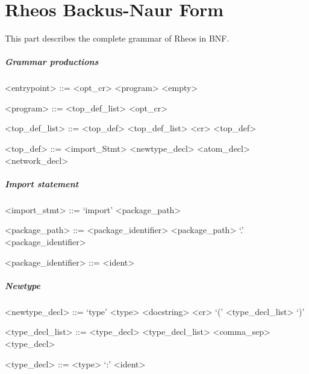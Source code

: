 \chapter{Rheos Backus-Naur Form}\label{ch:bnf}
This part describes the complete grammar of Rheos in BNF.


\paragraph{Grammar productions}

\begin{grammar}
  <entrypoint> ::= <opt_cr> <program>
  \alt <empty>

  <program> ::= <top_def_list> <opt_cr>

  <top_def_list> ::= <top_def>
  \alt <top_def_list> <cr> <top_def>

  <top_def> ::= <import_Stmt>
  \alt <newtype_decl>
  \alt <atom_decl>
  \alt <network_decl>
\end{grammar}


\paragraph{Import statement}

\begin{grammar}
  <import_stmt> ::= `import' <package_path>

  <package_path> ::= <package_identifier>
  \alt <package_path> `.' <package_identifier>

  <package_identifier> ::= <ident>
\end{grammar}


\paragraph{Newtype}

\begin{grammar}
  <newtype_decl> ::= `type' <type> <docstring> <cr> `('
  <type_decl_list> `)'

  <type_decl_list> ::= <type_decl>
  \alt <type_decl_list> <comma_sep> <type_decl>

  <type_decl> ::= <type> `:' <ident>
\end{grammar}


